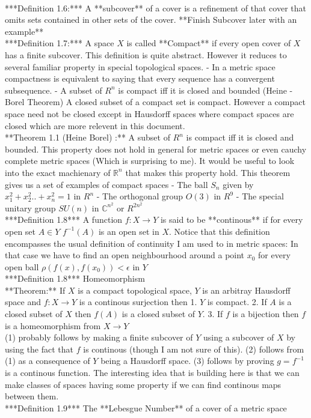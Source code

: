 \documentclass{article}
\theoremstyle{definition}
\theoremstyle{remark}
\begin{document}
\\
***Definition 1.6:*** A **subcover** of a cover is a refinement of that cover that omits sets contained in other sets of the cover.  
**Finish Subcover later with an example**  
\\
***Definition 1.7:*** A space $X$ is called **Compact** if every open cover of $X$ has a finite subcover.  
This definition is quite abstract. However it reduces to several familiar property in special topological spaces. 
- In a metric space compactness is equivalent to saying that every sequence has a convergent subsequence. 
- A subset of $R^n$ is compact iff it is closed and bounded (Heine - Borel Theorem)  
A closed subset of a compact set is compact. However a compact space need not be closed except in Hausdorff spaces where compact spaces are closed which are more relevent in this document.  
\\
**Theorem 1.1 (Heine Borel) :** A subset of $R^n$ is compact iff it is closed and bounded. This property does not hold in general for metric spaces or even cauchy complete metric spaces (Which is surprising to me). It would be useful to look into the exact machienary of $\mathbb{R}^n$ that makes this property hold. This theorem gives us a set of examples of compact spaces
- The ball $S_n$ given by $x_1^2 +x_2^2..+x_n^2 = 1$ in $R^n$
- The orthogonal group $O(3)$ in $R^9$
- The special unitary group $SU(n)$ in $\mathbb{C}^{n^2}$ or $R^{2n^2}$
\\
***Definition 1.8*** A function $f: X \to Y$ is said to be **continous** if for every open set $A \in Y$ $f^{-1}(A)$ is an open set in $X$. Notice that this definition encompasses the usual definition of continuity I am used to in metric spaces: In that case we have to find an open neighbourhood around a point $x_0$ for every open ball $\rho(f(x),f(x_0)) < \epsilon$ in $Y$
\\
***Definition 1.8*** Homeomorphism  
\\
**Theorem:** If $X$ is a compact topological space, $Y$ is an arbitray Hausdorff space and $f: X \to Y$ is a continous surjection then 
1. $Y$ is compact. 
2. If $A$ is a closed subset of $X$ then $f(A)$ is a closed subset of $Y$. 
3. If $f$ is a bijection then $f$ is a homeomorphism from $X \to Y$  
   \\
(1) probably follows by making a finite subcover of $Y$ using a subcover of $X$ by using the fact that $f$ is continous (though I am not sure of this). (2) follows from (1) as a consequence of $Y$ being a Hausdorff space. (3) follows by proving $g = f^{-1}$ is a continous function.
The interesting idea that is building here is that we can make classes of spaces having some property if we can find continous maps between them.  
\\
***Definition 1.9*** The **Lebesgue Number** of a cover of a metric space 
\end{document}

